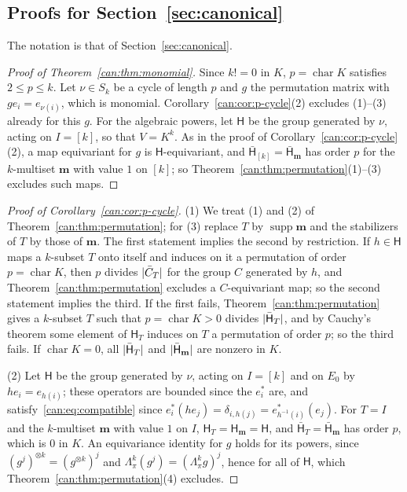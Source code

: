 \subsection{Proofs for Section~\ref{sec:canonical}}\label{dfr:ssec:canonical}

The notation is that of Section~\ref{sec:canonical}.

\begin{proof}[Proof of Theorem~\ref{can:thm:monomial}]
Since $k!=0$ in $K$, $p=\operatorname{char}K$ satisfies $2\le p\le k$. Let $\nu\in S_k$ be a cycle of length $p$ and $g$
the permutation matrix with $ge_i=e_{\nu(i)}$, which is monomial. Corollary~\ref{can:cor:p-cycle}(2) excludes (1)--(3)
already for this $g$. For the algebraic powers, let $\mathsf H$ be the group generated by $\nu$, acting on $I=[k]$, so
that $V=K^k$. As in the proof of Corollary~\ref{can:cor:p-cycle}(2), a map equivariant for $g$ is
$\mathsf H$\nobreakdash-equivariant, and $\bar{\mathsf H}_{[k]}=\bar{\mathsf H}_{\mathbf m}$ has order $p$ for the
$k$\nobreakdash-multiset $\mathbf m$ with value $1$ on $[k]$; so Theorem~\ref{can:thm:permutation}(1)--(3) excludes such
maps.
\end{proof}

\begin{proof}[Proof of Corollary~\ref{can:cor:p-cycle}]
(1) We treat (1) and (2) of Theorem~\ref{can:thm:permutation}; for (3) replace $T$ by $\operatorname{supp}\mathbf m$ and
the stabilizers of $T$ by those of $\mathbf m$. The first statement implies the second by restriction. If $h\in\mathsf H$
maps a $k$\nobreakdash-subset $T$ onto itself and induces on it a permutation of order $p=\operatorname{char}K$, then $p$
divides $\lvert \bar C_T\rvert$ for the group $C$ generated by $h$, and Theorem~\ref{can:thm:permutation} excludes a
$C$\nobreakdash-equivariant map; so the second statement implies the third. If the first fails,
Theorem~\ref{can:thm:permutation} gives a $k$\nobreakdash-subset $T$ such that $p=\operatorname{char}K>0$ divides
$\lvert \bar{\mathsf H}_T\rvert$, and by Cauchy's theorem some element of $\mathsf H_T$ induces on $T$ a permutation of order
$p$; so the third fails. If $\operatorname{char}K=0$, all $\lvert \bar{\mathsf H}_T\rvert$ and $\lvert \bar{\mathsf H}_{\mathbf m}\rvert$
are nonzero in $K$.

(2) Let $\mathsf H$ be the group generated by $\nu$, acting on $I=[k]$ and on $E_0$ by $he_i=e_{h(i)}$; these operators
are bounded since the $e^*_i$ are, and satisfy~\eqref{can:eq:compatible} since
$e^*_i(he_j)=\delta_{i,h(j)}=e^*_{h^{-1}(i)}(e_j)$. For $T=I$ and the $k$\nobreakdash-multiset $\mathbf m$ with value $1$
on $I$, $\mathsf H_T=\mathsf H_{\mathbf m}=\mathsf H$, and $\bar{\mathsf H}_T=\bar{\mathsf H}_{\mathbf m}$ has order $p$,
which is $0$ in $K$. An equivariance identity for $g$ holds for its powers, since $(g^j)^{\otimes k}=(g^{\otimes k})^j$
and $\Lambda^k_\pi(g^j)=(\Lambda^k_\pi g)^j$, hence for all of $\mathsf H$, which Theorem~\ref{can:thm:permutation}(4)
excludes.
\end{proof}

